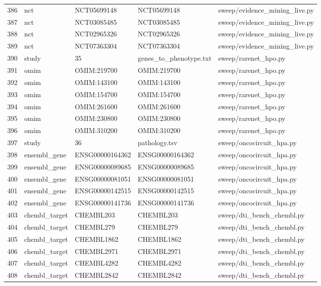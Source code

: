 {\begin{longtable}{rllp{3.2cm}p{4.2cm}}
386 & nct & NCT05699148 & NCT05699148 & sweep/evidence\_mining\_live.py\\
387 & nct & NCT03085485 & NCT03085485 & sweep/evidence\_mining\_live.py\\
388 & nct & NCT02965326 & NCT02965326 & sweep/evidence\_mining\_live.py\\
389 & nct & NCT07363304 & NCT07363304 & sweep/evidence\_mining\_live.py\\
390 & study & 35 & genes\_to\_phenotype.txt & sweep/rarenet\_hpo.py\\
391 & omim & OMIM:219700 & OMIM:219700 & sweep/rarenet\_hpo.py\\
392 & omim & OMIM:143100 & OMIM:143100 & sweep/rarenet\_hpo.py\\
393 & omim & OMIM:154700 & OMIM:154700 & sweep/rarenet\_hpo.py\\
394 & omim & OMIM:261600 & OMIM:261600 & sweep/rarenet\_hpo.py\\
395 & omim & OMIM:230800 & OMIM:230800 & sweep/rarenet\_hpo.py\\
396 & omim & OMIM:310200 & OMIM:310200 & sweep/rarenet\_hpo.py\\
397 & study & 36 & pathology.tsv & sweep/oncocircuit\_hpa.py\\
398 & ensembl\_gene & ENSG00000164362 & ENSG00000164362 & sweep/oncocircuit\_hpa.py\\
399 & ensembl\_gene & ENSG00000089685 & ENSG00000089685 & sweep/oncocircuit\_hpa.py\\
400 & ensembl\_gene & ENSG00000081051 & ENSG00000081051 & sweep/oncocircuit\_hpa.py\\
401 & ensembl\_gene & ENSG00000142515 & ENSG00000142515 & sweep/oncocircuit\_hpa.py\\
402 & ensembl\_gene & ENSG00000141736 & ENSG00000141736 & sweep/oncocircuit\_hpa.py\\
403 & chembl\_target & CHEMBL203 & CHEMBL203 & sweep/dti\_bench\_chembl.py\\
404 & chembl\_target & CHEMBL279 & CHEMBL279 & sweep/dti\_bench\_chembl.py\\
405 & chembl\_target & CHEMBL1862 & CHEMBL1862 & sweep/dti\_bench\_chembl.py\\
406 & chembl\_target & CHEMBL2971 & CHEMBL2971 & sweep/dti\_bench\_chembl.py\\
407 & chembl\_target & CHEMBL4282 & CHEMBL4282 & sweep/dti\_bench\_chembl.py\\
408 & chembl\_target & CHEMBL2842 & CHEMBL2842 & sweep/dti\_bench\_chembl.py\\

\end{longtable}}
